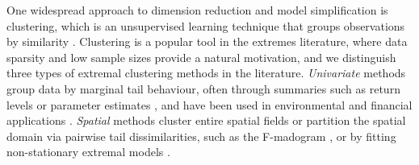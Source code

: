 \documentclass[12pt]{article}
\begin{document}
One widespread approach to dimension reduction and model simplification is clustering, which is an unsupervised learning technique that groups observations by similarity \citep{Hastie2009}.
Clustering is a popular tool in the extremes literature, where data sparsity and low sample sizes provide a natural motivation, and we distinguish three types of extremal clustering methods in the literature.
\emph{Univariate} methods group data by marginal tail behaviour, often through summaries such as return levels or parameter estimates \citep{Coles2001}, and have been used in environmental and financial applications \citep{Alonso2014-rr, deCarvalho2023, Zheng2023-jf}.
\emph{Spatial} methods cluster entire spatial fields or partition the spatial domain via  pairwise tail dissimilarities, such as the F-madogram \citep{Cooley2006variograms, Bernard2013}, or by fitting non-stationary extremal models \citep{Carreau2017, Rohrbeck2021, Dupuis2023, Shao2025}. 
\end{document}
